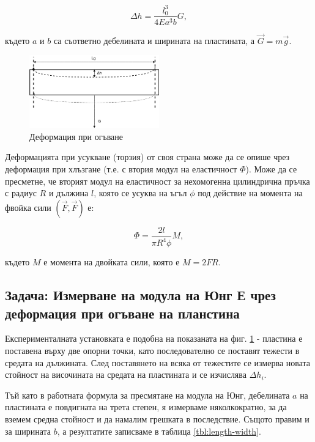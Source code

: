 \documentclass[12pt]{article}
\begin{document}
\begin{equation}\label{eq:delta-h}
    \Delta h = \frac{l_0^3}{4Ea^3b}G,
\end{equation}

където $a$ и $b$ са съответно дебелината и ширината на пластината, а $\Vec{G} = m\Vec{g}$.

\begin{figure}
    \centering
    \includegraphics[width=0.5\textwidth]{images/young-bending.drawio.png}
    \caption{Деформация при огъване}
    \label{fig:bending}
\end{figure}

Деформацията при усукване (торзия) от своя страна може да се опише чрез деформация при хлъзгане (т.е. с втория модул на еластичност $\Phi$). Може да се пресметне, че вторият модул на еластичност за нехомогенна цилиндрична пръчка с радиус $R$ и дължина $l$, която се усуква на ъгъл $\phi$ под действие на момента на фвойка сили $(\Vec{F}, \Vec{F})$ е:

\begin{equation}\label{eq:phi-modulus}
    \Phi = \frac{2l}{\pi R^4 \phi}M,
\end{equation}

където $M$ е момента на двойката сили, която е $M=2FR$.
\subsection{Задача: Измерване на модула на Юнг Е чрез деформация при огъване на планстина}

Експерименталната установката е подобна на показаната на фиг. \ref{fig:bending} - пластина е поставена върху две опорни точки, като последователно се поставят тежести в средата на дължината. След поставянето на всяка от тежестите се измерва новата стойност на височината на средата на пластината и се изчислява $\Delta h_i$. 

Тъй като в работната формула за пресмятане на модула на Юнг, дебелината $a$ на пластината е повдигната на трета степен, я измерваме няколкократно, за да вземем средна стойност и да намалим грешката в последствие. Същото правим и за ширината $b$, а резултатите записваме в таблица \ref{tbl:length-width}.
\end{document}

